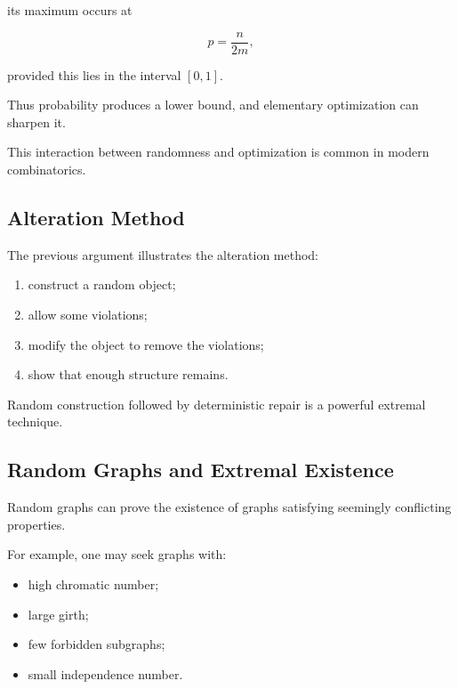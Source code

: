 its maximum occurs at

\[
p=\frac{n}{2m},
\]

provided this lies in the interval \([0,1]\).

Thus probability produces a lower bound, and elementary optimization
can sharpen it.

This interaction between randomness and optimization is common in
modern combinatorics.

\subsection{Alteration Method}
\label{subsec:alteration-method}

The previous argument illustrates the alteration method:

\begin{enumerate}
    \item construct a random object;
    \item allow some violations;
    \item modify the object to remove the violations;
    \item show that enough structure remains.
\end{enumerate}

Random construction followed by deterministic repair is a powerful
extremal technique.

\subsection{Random Graphs and Extremal Existence}
\label{subsec:random-graphs-extremal-preview}

Random graphs can prove the existence of graphs satisfying seemingly
conflicting properties.

For example, one may seek graphs with:

\begin{itemize}
    \item high chromatic number;
    \item large girth;
    \item few forbidden subgraphs;
    \item small independence number.
\end{itemize}

